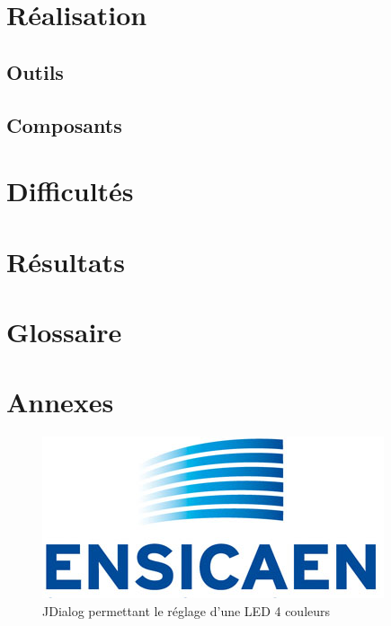 \documentclass[a4paper,11pt]{myreport}
\begin{document}
\chapter{Réalisation}
\section{Outils}
\section{Composants}
\chapter{Difficultés}

\chapter{Résultats}

\chapter{Glossaire}

\chapter{Annexes}

\begin{figure}[h]
	\includegraphics[scale=0.70]{./images/LogoEnsicaenSansTexte.jpg}
	\caption{JDialog permettant le réglage d'une LED 4 couleurs}
\end{figure}
\end{document}
